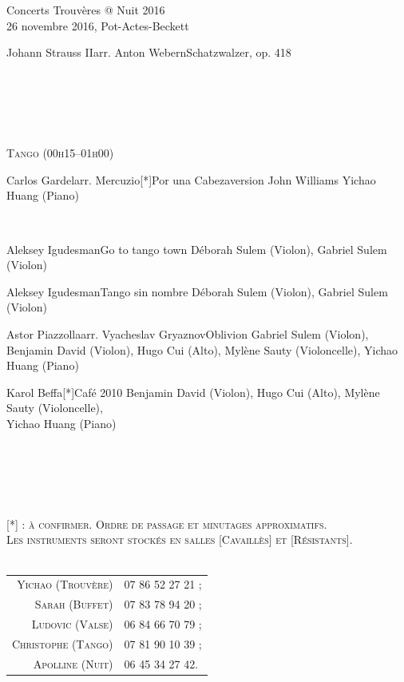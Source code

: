 \documentclass[a4paper,11pt,poets,durations]{ConcProg}
\begin{document}
{\begin{programme}{
    Concerts Trouvères @ Nuit 2016
\\  {\normalsize 26 novembre 2016, Pot-Actes-Beckett}
}
\begin{part}[]
\begin{composition}{Johann Strauss II}{arr. Anton Webern}{Schatzwalzer, op. 418}{}
    \end{composition}\\
~\\
~\\
~\\
\begin{center}
\textsc{Tango (00h15--01h00)}
\end{center}
    \begin{composition}{Carlos Gardel}{arr. Mercuzio}{[*]Por una Cabeza}{version John Williams}
      {\small Yichao Huang (Piano)}
    \end{composition}\\
    \begin{composition}{Aleksey Igudesman}{}{Go to tango town}{}
      {\small Déborah Sulem (Violon), Gabriel Sulem (Violon)}
    \end{composition}
    \begin{composition}{Aleksey Igudesman}{}{Tango sin nombre}{}
      {\small Déborah Sulem (Violon), Gabriel Sulem (Violon)}
    \end{composition}
    \begin{composition}{Astor Piazzolla}{arr. Vyacheslav Gryaznov}{Oblivion}{}
      {\small Gabriel Sulem (Violon), Benjamin David (Violon), Hugo Cui (Alto), Mylène Sauty (Violoncelle), Yichao Huang (Piano)}
    \end{composition}
    \begin{composition}{Karol Beffa}{}{[*]Café 2010}{}
      {\small Benjamin David (Violon), Hugo Cui (Alto), Mylène Sauty (Violoncelle),\\Yichao Huang (Piano)}
    \end{composition}\\
~\\
~\\
~\\
\begin{center}
\textsc{[*] : à confirmer. Ordre de passage et minutages approximatifs.\\Les instruments seront stockés en salles [Cavaillès] et [Résistants].}\\
~\\
\begin{tabular}{rl}
\textsc{Yichao (Trouvère)} & \textsc{07 86 52 27 21 ;}\\
\textsc{Sarah (Buffet)} & \textsc{07 83 78 94 20 ;}\\
\textsc{Ludovic (Valse)} & \textsc{06 84 66 70 79 ;}\\
\textsc{Christophe (Tango)} & \textsc{07 81 90 10 39 ;}\\
\textsc{Apolline (Nuit)} & \textsc{06 45 34 27 42.}
\end{tabular}
\end{center}
  \end{part}
\end{programme}
}
\end{document}
